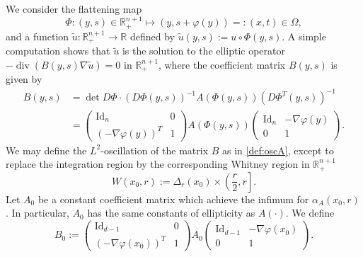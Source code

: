 \documentclass[11pt, a4paper,leqno]{amsart}
\theoremstyle{plain}
\theoremstyle{definition}
\theoremstyle{remark}
\numberwithin{equation}{section}
\DeclareMathOperator{\Id}{Id}
\newcommand{\RR}{{\mathbb{R}}}
\DeclareMathOperator{\divg}{div}
\begin{document}
We consider the flattening map
\[ \Phi: (y,s) \in \RR^{n+1}_+ \mapsto (y,s+\varphi(y)) =: (x,t) \in \Omega, \]
and a function $\tilde{u}: \RR^{n+1}_+ \to \RR$ defined by $\tilde{u}(y,s) := u \circ \Phi(y,s)$. A simple computation shows that $\tilde{u}$ is the solution to the elliptic operator $-\divg(B(y,s) \nabla \tilde{u}) = 0$ in $\RR^{n+1}_+$, where the coefficient matrix $B(y,s)$ is given by
\begin{align}
	B(y,s) & = \det D\Phi  \cdot \left( D\Phi(y,s) \right)^{-1} A(\Phi(y,s)) \left( D\Phi^T(y,s) \right)^{-1} \nonumber \\
	& = \begin{pmatrix}
	\Id_{n} & 0 \\
	\left( -\nabla \varphi(y) \right)^T & 1
\end{pmatrix} A(\Phi(y,s)) \begin{pmatrix}
	\Id_{n} & -\nabla \varphi(y) \\
	0 & 1
\end{pmatrix}. \label{def:B}
\end{align} 
We may define the $L^2$-oscillation of the matrix $B$ as in \eqref{def:oscA}, except to replace the integration region by the corresponding Whitney region in $\RR^{n+1}_+$
\[ W(x_0, r) := \Delta_r(x_0) \times \left(\frac{r}{2}, r \right]. \]
Let $A_0$ be a constant coefficient matrix which achieve the infimum for $\alpha_A(x_0, r)$. In particular, $A_0$ has the same constants of ellipticity as $A(\cdot)$. We define
\[ B_0 := \begin{pmatrix}
	\Id_{d-1} & 0 \\
	\left( -\nabla \varphi(x_0) \right)^T & 1
\end{pmatrix} A_0 \begin{pmatrix}
	\Id_{d-1} & -\nabla \varphi(x_0) \\
	0 & 1
\end{pmatrix}. \]
\end{document}

